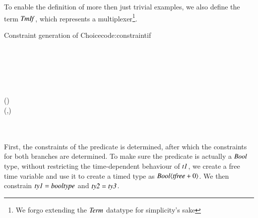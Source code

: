 To enable the definition of more then just trivial examples, we also define the term \ensuremath{\Conid{TmIf}}, which represents a multiplexer\footnote{We forgo extending the \ensuremath{\Conid{Term}} datatype for simplicity's sake}.
\begin{texexptitled}{Constraint generation of Choice}{code:constraintif}
\begin{hscode}\SaveRestoreHook
{}%
%
%
%
\>[B]{}\;\;\;\to {}\<[E]%
\\
\>[B]{}\<[9]%
\>[9]{}\;{}\<[13]%
\>[13]{}\leftarrow{}\;\<[E]%
\\
\>[13]{}\leftarrow{}\;\<[E]%
\\
\>[13]{}\leftarrow{}\;\<[E]%
\\
\>[13]{}\leftarrow{}\<[E]%
\\
\>[13]{}\;\mathrel{=}\mathbin{\$}\;\;(\;\;){}\<[E]%
\\
\>[13]{}\;(,){}\<[E]%
\\
\>[13]{}\<[E]%
\\
\>[13]{}\<[E]%
\\
\>[13]{}\;\<[E]%
\ColumnHook
\end{hscode}\resethooks
\end{texexptitled}
First, the constraints of the predicate is determined, after which the constraints for both branches are determined.
To make sure the predicate is actually a \ensuremath{\Conid{Bool}} type, without restricting the time-dependent behaviour of \ensuremath{\Varid{t1}}, we create a free time variable and use it to create a timed type as \ensuremath{\Conid{Bool}\langle\Varid{tfree}\mathbin{+}\mathrm{0}\rangle}.
We then constrain \ensuremath{\Varid{ty1}\mathrel{=}\Varid{booltype}} and \ensuremath{\Varid{ty2}\mathrel{=}\Varid{ty3}}.

